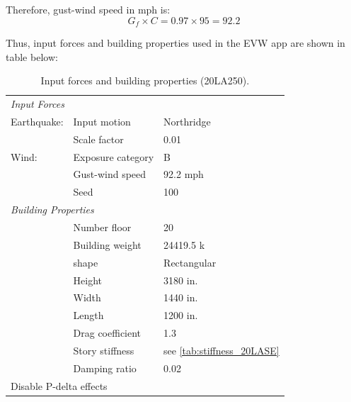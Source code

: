 \documentclass{simcenterdocumentation}
\begin{document}
Therefore, gust-wind speed in mph is:
\begin{equation*}
G_f \times C = 0.97 \times 95 = \boxed{92.2}
\end{equation*}

Thus, input forces and building properties used in the EVW app are shown in table below:

\begin{table}[H]
	\centering \caption{Input forces and building properties (20LA250).}
	\begin{tabular}{lll}
	\toprule
	\multicolumn{3}{l}{\textit{Input Forces}}					\\
	\cmidrule(rl){1-3}
	Earthquake:		& Input motion		& Northridge			\\
					& Scale factor		& 0.01					\\
	Wind:			& Exposure category	& B						\\
					& Gust-wind speed	& 92.2 mph				\\
					& Seed				& 100					\\
	\midrule
	\multicolumn{3}{l}{\textit{Building Properties}}			\\
	\cmidrule(rl){1-3}
					& Number floor		& 20					\\
					& Building weight	& 24419.5 k				\\
					& shape				& Rectangular			\\
					& Height			& 3180 in.				\\
					& Width				& 1440 in.				\\
					& Length			& 1200 in.				\\
					& Drag coefficient	& 1.3					\\
					& Story stiffness	& see \cref{tab:stiffness_20LASE}			\\
					& Damping ratio		& 0.02					\\
	\midrule
	\multicolumn{3}{l}{Disable P-delta effects}					\\
	\bottomrule
	\end{tabular}
\end{table}
\end{document}
